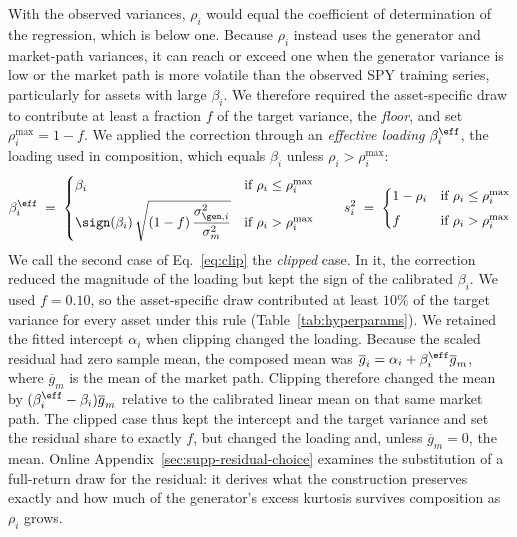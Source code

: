 With the observed variances, $\rho_i$ would equal the coefficient of
determination of the regression, which is below one. Because $\rho_i$
instead uses the generator and market-path variances, it can reach or exceed one when the generator
variance is low or the market path is more volatile than the observed
SPY training series, particularly for assets with large $\beta_i$. We therefore required the asset-specific draw to
contribute at least a fraction $f$ of the target variance, the
\emph{floor}, and set
$\rho_i^{\max}=1-f$. We applied the correction through an
\emph{effective loading} $\beta_i^{\eff}$, the loading used in
composition, which equals $\beta_i$ unless $\rho_i>\rho_i^{\max}$:
\begin{equation}
  \beta_i^{\eff} \;=\;
  \begin{cases}
    \beta_i & \text{if } \rho_i \le \rho_i^{\max} \\[4pt]
    \sign(\beta_i)\,\sqrt{(1 - f)\,\dfrac{\sigma_{\gen,i}^2}{\sigma_m^2}} & \text{if } \rho_i > \rho_i^{\max}
  \end{cases}
  \qquad
  s_i^2 \;=\;
  \begin{cases}
    1 - \rho_i & \text{if } \rho_i \le \rho_i^{\max} \\[4pt]
    f          & \text{if } \rho_i > \rho_i^{\max}
  \end{cases}
  \label{eq:clip}
\end{equation}
We call the second case of Eq.~\eqref{eq:clip} the \emph{clipped}
case. In it, the correction reduced the magnitude of the loading but
kept the sign of the calibrated $\beta_i$. We used $f=0.10$, so the asset-specific draw contributed
at least $10\%$ of the target variance for every asset under this rule
(Table~\ref{tab:hyperparams}). We retained the fitted intercept
$\alpha_i$ when clipping changed the loading. Because the scaled
residual had zero sample mean, the composed mean was
$\overline{g}_i=\alpha_i+\beta_i^{\eff}\overline{g}_m$, where
$\overline{g}_m$ is the mean of the market path. Clipping therefore
changed the mean by $(\beta_i^{\eff}-\beta_i)\overline{g}_m$ relative
to the calibrated linear mean on that same market path. The clipped case thus kept the intercept and the target variance and
set the residual share to exactly $f$, but changed the loading and,
unless $\overline{g}_m=0$, the mean. Online
Appendix~\ref{sec:supp-residual-choice} examines the substitution of
a full-return draw for the residual: it derives what the construction
preserves exactly and how much of the generator's excess kurtosis
survives composition as $\rho_i$ grows.

